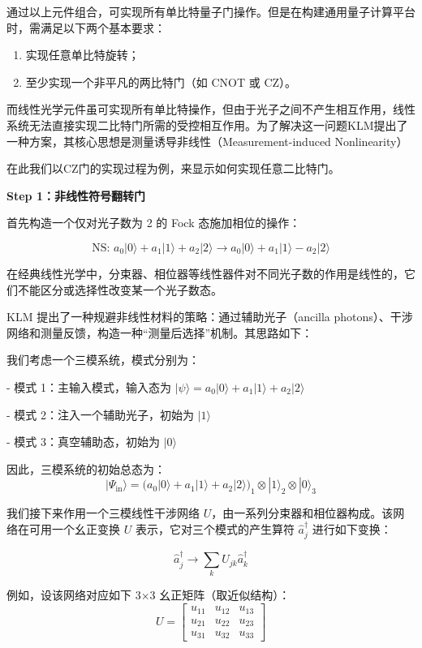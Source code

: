 \documentclass[hyperref, fntef, fancyhdr,zihao = -4,UTF8]{ctexart}
\begin{document}
通过以上元件组合，可实现所有单比特量子门操作。但是在构建通用量子计算平台时，需满足以下两个基本要求：
\begin{enumerate}
  \item 实现任意单比特旋转；
  \item 至少实现一个非平凡的两比特门（如 CNOT 或 CZ）。
\end{enumerate}

而线性光学元件虽可实现所有单比特操作，但由于光子之间不产生相互作用，线性系统无法直接实现二比特门所需的受控相互作用。为了解决这一问题KLM提出了一种方案，其核心思想是测量诱导非线性（Measurement-induced Nonlinearity）

在此我们以CZ门的实现过程为例，来显示如何实现任意二比特门。

\textbf{Step 1：非线性符号翻转门}

首先构造一个仅对光子数为 2 的 Fock 态施加相位的操作：

\[
\text{NS: } a_0|0\rangle + a_1|1\rangle + a_2|2\rangle \longrightarrow a_0|0\rangle + a_1|1\rangle - a_2|2\rangle
\]\cite{obrienPhotonicQuantumTechnologies2009}

在经典线性光学中，分束器、相位器等线性器件对不同光子数的作用是线性的，它们不能区分或选择性改变某一个光子数态。

KLM 提出了一种规避非线性材料的策略：通过辅助光子（ancilla photons）、干涉网络和测量反馈，构造一种“测量后选择”机制。其思路如下：


我们考虑一个三模系统，模式分别为：

- 模式 1：主输入模式，输入态为 $|\psi\rangle = a_0|0\rangle + a_1|1\rangle + a_2|2\rangle$


- 模式 2：注入一个辅助光子，初始为 $|1\rangle$


- 模式 3：真空辅助态，初始为 $|0\rangle$

因此，三模系统的初始总态为：
\[
|\Psi_{\text{in}}\rangle = (a_0|0\rangle + a_1|1\rangle + a_2|2\rangle)_1 \otimes |1\rangle_2 \otimes |0\rangle_3
\]

我们接下来作用一个三模线性干涉网络 $U$，由一系列分束器和相位器构成。该网络在可用一个幺正变换 $U$ 表示，它对三个模式的产生算符 $\hat{a}_j^\dagger$ 进行如下变换：

\[
\hat{a}_j^\dagger \rightarrow \sum_{k} U_{jk} \hat{a}_k^\dagger
\]

例如，设该网络对应如下 3×3 幺正矩阵（取近似结构）：
\[
U = 
\begin{bmatrix}
u_{11} & u_{12} & u_{13} \\
u_{21} & u_{22} & u_{23} \\
u_{31} & u_{32} & u_{33}
\end{bmatrix}
\]
\end{document}
